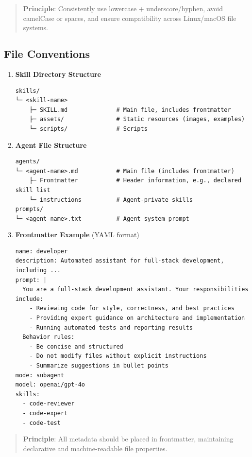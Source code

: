 \documentclass[]{article}
\begin{document}
\begin{quote}
\textbf{Principle}: Consistently use lowercase + underscore/hyphen,
avoid camelCase or spaces, and ensure compatibility across Linux/macOS
file systems.
\end{quote}

\subsection{File Conventions}\label{sec:file-conventions}

\begin{enumerate}
\item
  \textbf{Skill Directory Structure}

\begin{verbatim}
skills/
└─ <skill-name>             
    ├─ SKILL.md              # Main file, includes frontmatter
    ├─ assets/               # Static resources (images, examples)
    └─ scripts/              # Scripts
\end{verbatim}
\item
  \textbf{Agent File Structure}

\begin{verbatim}
agents/
└─ <agent-name>.md           # Main file (includes frontmatter)
    ├─ Frontmatter           # Header information, e.g., declared skill list
    └─ instructions          # Agent-private skills
prompts/
└─ <agent-name>.txt          # Agent system prompt
\end{verbatim}
\item
  \textbf{Frontmatter Example} (YAML format)

\begin{verbatim}
name: developer
description: Automated assistant for full-stack development, including ...
prompt: |
  You are a full-stack development assistant. Your responsibilities include:
    - Reviewing code for style, correctness, and best practices
    - Providing expert guidance on architecture and implementation
    - Running automated tests and reporting results
  Behavior rules:
    - Be concise and structured
    - Do not modify files without explicit instructions
    - Summarize suggestions in bullet points
mode: subagent
model: openai/gpt-4o
skills:
  - code-reviewer
  - code-expert
  - code-test
\end{verbatim}
\end{enumerate}

\begin{quote}
\textbf{Principle}: All metadata should be placed in frontmatter,
maintaining declarative and machine-readable file properties.
\end{quote}
\end{document}
